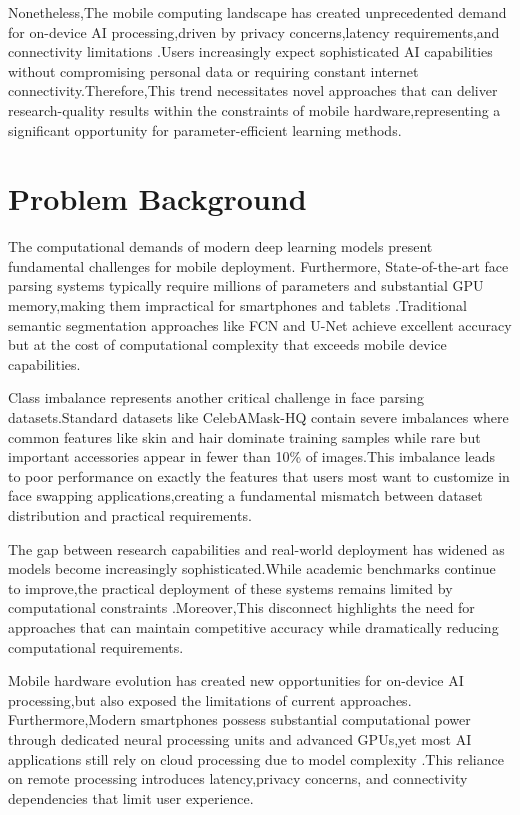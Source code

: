 \documentclass[12pt,a4paper]{report}
\begin{document}
Nonetheless,The mobile computing landscape has created unprecedented demand for on-device AI processing,driven by privacy concerns,latency requirements,and connectivity limitations \cite{chen2022mobile}.Users increasingly expect sophisticated AI capabilities without compromising personal data or requiring constant internet connectivity.Therefore,This trend necessitates novel approaches that can deliver research-quality results within the constraints of mobile hardware,representing a significant opportunity for parameter-efficient learning methods.

\section{Problem Background}

The computational demands of modern deep learning models present fundamental challenges for mobile deployment. Furthermore, State-of-the-art face parsing systems typically require millions of parameters and substantial GPU memory,making them impractical for smartphones and tablets \cite{howard2017mobilenets}.Traditional semantic segmentation approaches like FCN \cite{long2015fully} and U-Net \cite{ronneberger2015unet} achieve excellent accuracy but at the cost of computational complexity that exceeds mobile device capabilities.

Class imbalance represents another critical challenge in face parsing datasets.Standard datasets like CelebAMask-HQ \cite{lee2020maskgan} contain severe imbalances where common features like skin and hair dominate training samples while rare but important accessories appear in fewer than 10\% of images.This imbalance leads to poor performance on exactly the features that users most want to customize in face swapping applications,creating a fundamental mismatch between dataset distribution and practical requirements.

The gap between research capabilities and real-world deployment has widened as models become increasingly sophisticated.While academic benchmarks continue to improve,the practical deployment of these systems remains limited by computational constraints \cite{tan2019efficientnet}.Moreover,This disconnect highlights the need for approaches that can maintain competitive accuracy while dramatically reducing computational requirements.

Mobile hardware evolution has created new opportunities for on-device AI processing,but also exposed the limitations of current approaches. Furthermore,Modern smartphones possess substantial computational power through dedicated neural processing units and advanced GPUs,yet most AI applications still rely on cloud processing due to model complexity \cite{sandler2018mobilenetv2}.This reliance on remote processing introduces latency,privacy concerns, and connectivity dependencies that limit user experience.
\end{document}
